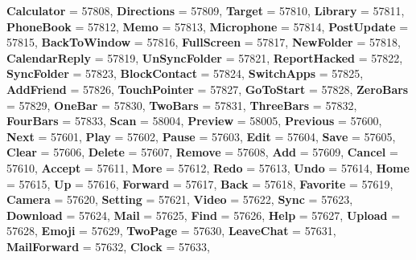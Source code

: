 \begin{DoxyCompactItemize}
{\bfseries Calculator} = 57808, 
{\bfseries Directions} = 57809, 
{\bfseries Target} = 57810, 
\newline
{\bfseries Library} = 57811, 
{\bfseries Phone\+Book} = 57812, 
{\bfseries Memo} = 57813, 
{\bfseries Microphone} = 57814, 
\newline
{\bfseries Post\+Update} = 57815, 
{\bfseries Back\+To\+Window} = 57816, 
{\bfseries Full\+Screen} = 57817, 
{\bfseries New\+Folder} = 57818, 
\newline
{\bfseries Calendar\+Reply} = 57819, 
{\bfseries Un\+Sync\+Folder} = 57821, 
{\bfseries Report\+Hacked} = 57822, 
{\bfseries Sync\+Folder} = 57823, 
\newline
{\bfseries Block\+Contact} = 57824, 
{\bfseries Switch\+Apps} = 57825, 
{\bfseries Add\+Friend} = 57826, 
{\bfseries Touch\+Pointer} = 57827, 
\newline
{\bfseries Go\+To\+Start} = 57828, 
{\bfseries Zero\+Bars} = 57829, 
{\bfseries One\+Bar} = 57830, 
{\bfseries Two\+Bars} = 57831, 
\newline
{\bfseries Three\+Bars} = 57832, 
{\bfseries Four\+Bars} = 57833, 
{\bfseries Scan} = 58004, 
{\bfseries Preview} = 58005, 
\newline
{\bfseries Previous} = 57600, 
{\bfseries Next} = 57601, 
{\bfseries Play} = 57602, 
{\bfseries Pause} = 57603, 
\newline
{\bfseries Edit} = 57604, 
{\bfseries Save} = 57605, 
{\bfseries Clear} = 57606, 
{\bfseries Delete} = 57607, 
\newline
{\bfseries Remove} = 57608, 
{\bfseries Add} = 57609, 
{\bfseries Cancel} = 57610, 
{\bfseries Accept} = 57611, 
\newline
{\bfseries More} = 57612, 
{\bfseries Redo} = 57613, 
{\bfseries Undo} = 57614, 
{\bfseries Home} = 57615, 
\newline
{\bfseries Up} = 57616, 
{\bfseries Forward} = 57617, 
{\bfseries Back} = 57618, 
{\bfseries Favorite} = 57619, 
\newline
{\bfseries Camera} = 57620, 
{\bfseries Setting} = 57621, 
{\bfseries Video} = 57622, 
{\bfseries Sync} = 57623, 
\newline
{\bfseries Download} = 57624, 
{\bfseries Mail} = 57625, 
{\bfseries Find} = 57626, 
{\bfseries Help} = 57627, 
\newline
{\bfseries Upload} = 57628, 
{\bfseries Emoji} = 57629, 
{\bfseries Two\+Page} = 57630, 
{\bfseries Leave\+Chat} = 57631, 
\newline
{\bfseries Mail\+Forward} = 57632, 
{\bfseries Clock} = 57633, 

\end{DoxyCompactItemize}
